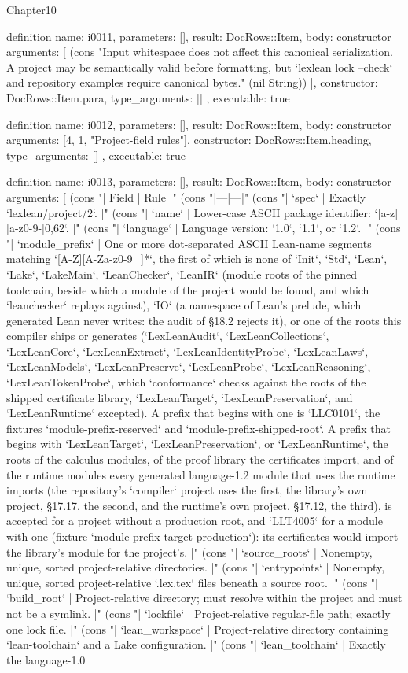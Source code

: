 \begin{lexlean}{Chapter10}
\begin{semanticmodule}
definition{
  name: i0011,
  parameters: [],
  result: DocRows::Item,
  body: constructor{
    arguments: [
      (cons "Input whitespace does not affect this canonical serialization. A project may be semantically valid before formatting, but `lexlean lock --check` and repository examples require canonical bytes." (nil String))
    ],
    constructor: DocRows::Item.para,
    type_arguments: []
  },
  executable: true
}

definition{
  name: i0012,
  parameters: [],
  result: DocRows::Item,
  body: constructor{
    arguments: [4, 1, "Project-field rules"],
    constructor: DocRows::Item.heading,
    type_arguments: []
  },
  executable: true
}

definition{
  name: i0013,
  parameters: [],
  result: DocRows::Item,
  body: constructor{
    arguments: [
      (cons "| Field | Rule |" (cons "|---|---|" (cons "| `spec` | Exactly `lexlean/project/2`. |" (cons "| `name` | Lower-case ASCII package identifier: `[a-z][a-z0-9-]{0,62}`. |" (cons "| `language` | Language version: `1.0`, `1.1`, or `1.2`. |" (cons "| `module_prefix` | One or more dot-separated ASCII Lean-name segments matching `[A-Z][A-Za-z0-9_]*`, the first of which is none of `Init`, `Std`, `Lean`, `Lake`, `LakeMain`, `LeanChecker`, `LeanIR` (module roots of the pinned toolchain, beside which a module of the project would be found, and which `leanchecker` replays against), `IO` (a namespace of Lean's prelude, which generated Lean never writes: the audit of §18.2 rejects it), or one of the roots this compiler ships or generates (`LexLeanAudit`, `LexLeanCollections`, `LexLeanCore`, `LexLeanExtract`, `LexLeanIdentityProbe`, `LexLeanLaws`, `LexLeanModels`, `LexLeanPreserve`, `LexLeanProbe`, `LexLeanReasoning`, `LexLeanTokenProbe`, which `conformance` checks against the roots of the shipped certificate library, `LexLeanTarget`, `LexLeanPreservation`, and `LexLeanRuntime` excepted). A prefix that begins with one is `LLC0101`, the fixtures `module-prefix-reserved` and `module-prefix-shipped-root`. A prefix that begins with `LexLeanTarget`, `LexLeanPreservation`, or `LexLeanRuntime`, the roots of the calculus modules, of the proof library the certificates import, and of the runtime modules every generated language-1.2 module that uses the runtime imports (the repository's `compiler` project uses the first, the library's own project, §17.17, the second, and the runtime's own project, §17.12, the third), is accepted for a project without a production root, and `LLT4005` for a module with one (fixture `module-prefix-target-production`): its certificates would import the library's module for the project's. |" (cons "| `source_roots` | Nonempty, unique, sorted project-relative directories. |" (cons "| `entrypoints` | Nonempty, unique, sorted project-relative `.lex.tex` files beneath a source root. |" (cons "| `build_root` | Project-relative directory; must resolve within the project and must not be a symlink. |" (cons "| `lockfile` | Project-relative regular-file path; exactly one lock file. |" (cons "| `lean_workspace` | Project-relative directory containing `lean-toolchain` and a Lake configuration. |" (cons "| `lean_toolchain` | Exactly the language-1.0 }}
\end{semanticmodule}
\end{lexlean}
